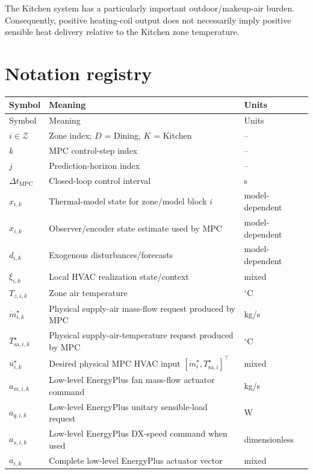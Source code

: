 \documentclass[11pt]{article}
\newcommand{\mdot}{\dot m}
\begin{document}
The Kitchen system has a particularly important outdoor/makeup-air burden.
Consequently, positive heating-coil output does not necessarily imply positive
sensible heat delivery relative to the Kitchen zone temperature.

\section{Notation registry}

\begin{longtable}{>{\raggedright\arraybackslash}p{}
                  >{\raggedright\arraybackslash}p{}
                  >{\raggedright\arraybackslash}p{}}
\toprule
Symbol & Meaning & Units \\
\midrule
\endfirsthead
\toprule
Symbol & Meaning & Units \\
\midrule
\endhead
$i\in\mathcal Z$ & Zone index; $D$ = Dining, $K$ = Kitchen & -- \\
$k$ & MPC control-step index & -- \\
$j$ & Prediction-horizon index & -- \\
$\Delta t_{\mathrm{MPC}}$ & Closed-loop control interval & s \\
$x_{i,k}$ & Thermal-model state for zone/model block $i$ & model-dependent \\
$\hat x_{i,k}$ & Observer/encoder state estimate used by MPC & model-dependent \\
$d_{i,k}$ & Exogenous disturbances/forecasts & model-dependent \\
$\xi_{i,k}$ & Local HVAC realization state/context & mixed \\
$T_{z,i,k}$ & Zone air temperature & $^\circ$C \\
$\mdot_{i,k}^\star$ & Physical supply-air mass-flow request produced by MPC & kg/s \\
$T_{\mathrm{sa},i,k}^\star$ & Physical supply-air-temperature request produced by MPC & $^\circ$C \\
$u_{i,k}^\star$ & Desired physical MPC HVAC input $[\mdot_i^\star,T_{\mathrm{sa},i}^\star]^\top$ & mixed \\
$a_{m,i,k}$ & Low-level EnergyPlus fan mass-flow actuator command & kg/s \\
$a_{q,i,k}$ & Low-level EnergyPlus unitary sensible-load request & W \\
$a_{s,i,k}$ & Low-level EnergyPlus DX-speed command when used & dimensionless \\
$a_{i,k}$ & Complete low-level EnergyPlus actuator vector & mixed \\

\end{longtable}
\end{document}
